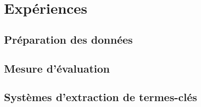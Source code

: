 \section{Expériences}
\label{sec:experiences}
  \subsection{Préparation des données}
  \label{subsec:preparation_des_donnees}

  \subsection{Mesure d'évaluation}
  \label{subsec:mesure_d_evaluation}

  \subsection{Systèmes d'extraction de termes-clés}

